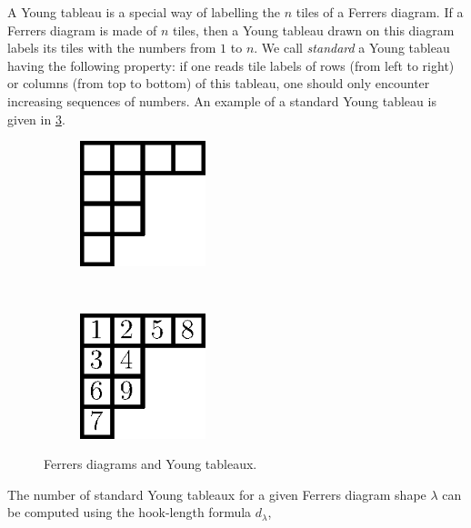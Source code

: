 A Young tableau is a special way of labelling the \(n\) tiles of a Ferrers
diagram. If a Ferrers diagram is made of $n$ tiles, then a Young tableau drawn
on this diagram labels its tiles with the numbers from $1$ to $n$. We call
\emph{standard} a Young tableau having the following property:
if one reads tile labels of rows (from left to right) or
columns (from top to bottom) of this tableau, one should only encounter increasing sequences of
numbers. An example of a standard Young tableau is given in
\ref{fig:xy:lattice:young}.

\begin{figure}
\centering
\begin{subfigure}[t]{0.47\textwidth}
\centering
	\includegraphics[width=0.4\textwidth]{fig/x+y/lattice/ferrers}
	\label{fig:xy:lattice:ferrers}
\end{subfigure}
~
\begin{subfigure}[t]{0.47\textwidth}
\centering
	\includegraphics[width=0.4\textwidth]{fig/x+y/lattice/young}
	\label{fig:xy:lattice:young}
\end{subfigure}
\caption{Ferrers diagrams and Young tableaux.}
\end{figure}

The number of standard Young tableaux for a given Ferrers diagram shape
\(\lambda\) can be computed using the hook-length formula \(d_{\lambda}\),

